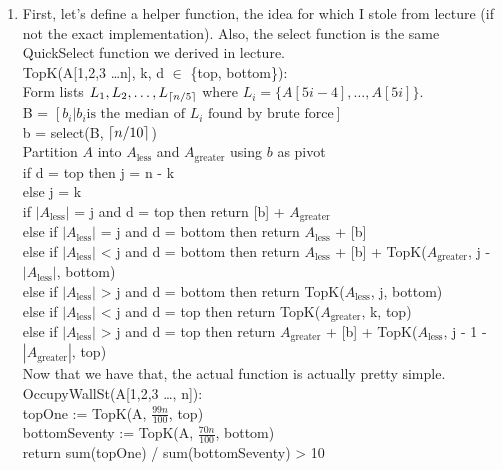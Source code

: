 \documentclass[11pt]{article}
\begin{document}
\begin{solution}
    \begin{enumerate}
        \item First, let's define a helper function, the idea for which I stole from lecture (if not the exact implementation). Also, the select function is the same QuickSelect function we derived in lecture. \\
            TopK(A[1,2,3 \ldots n], k, d $\in$ \{top, bottom\}):\\
            Form lists $L_1, L_2, \ldots, L_{\lceil n / 5 \rceil}$ where $L_i = \{A[5i - 4],\ldots,A[5i]\}$. \\
            B = $[ b_i | b_i \text{is the median of }L_i \text{ found by brute force}]$ \\ 
            b = select(B, $\lceil n / 10 \rceil$) \\
            Partition $A$ into $A_\text{less}$ and $A_\text{greater}$ using $b$ as pivot \\
            if d = top then j = n - k \\
            else j = k \\
            if $|A_\text{less}|$ = j and d = top then return [b] + $A_\text{greater}$ \\ 
            else if $|A_\text{less}|$ = j and d = bottom then return $A_\text{less}$ + [b] \\ 
            else if $|A_\text{less}|$ < j and d = bottom then return $A_\text{less}$ + [b] + TopK($A_\text{greater}$, j - $|A_\text{less}|$, bottom) \\
            else if $|A_\text{less}|$ > j and d = bottom then return TopK($A_\text{less}$, j, bottom) \\
            else if $|A_\text{less}|$ < j and d = top then return TopK($A_\text{greater}$, k, top) \\
            else if $|A_\text{less}|$ > j and d = top then return $A_\text{greater}$ + [b] + TopK($A_\text{less}$, j - 1 - $|A_\text{greater}|$, top) \\

            Now that we have that, the actual function is actually pretty simple. \\
            OccupyWallSt(A[1,2,3 \ldots, n]): \\
            topOne := TopK(A, $\frac{99n}{100}$, top) \\
            bottomSeventy := TopK(A, $\frac{70n}{100}$, bottom) \\
            return sum(topOne) / sum(bottomSeventy) > 10


\end{enumerate}
\end{solution}
\end{document}
